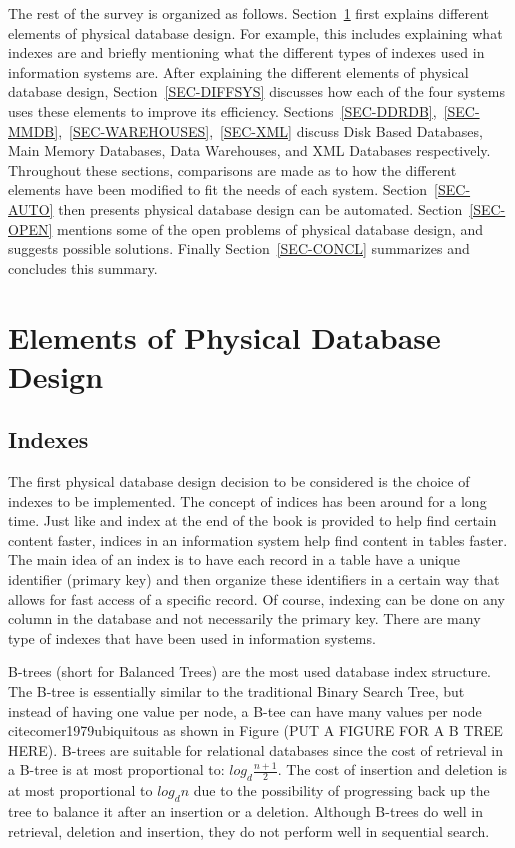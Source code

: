 \documentclass[12pt,a4paper]{article}
\begin{document}
The rest of the survey is organized as follows. Section~\ref{SEC-ELEMENTS} first explains different elements of physical database design. For example, this includes explaining what indexes are and briefly mentioning what the different types of indexes used in information systems are. After explaining the different elements of physical database design, Section~\ref{SEC-DIFFSYS} discusses how each of the four systems uses these elements to improve its efficiency. Sections~\ref{SEC-DDRDB},~\ref{SEC-MMDB},~\ref{SEC-WAREHOUSES},~\ref{SEC-XML} discuss Disk Based Databases, Main Memory Databases, Data Warehouses, and XML Databases respectively. Throughout these sections, comparisons are made as to how the different elements have been modified to fit the needs of each system. Section~\ref{SEC-AUTO} then presents physical database design can be automated. Section~\ref{SEC-OPEN} mentions some of the open problems of physical database design, and suggests possible solutions. Finally Section~\ref{SEC-CONCL} summarizes and concludes this summary.

\section{Elements of Physical Database Design}
\label{SEC-ELEMENTS}

\subsection{Indexes}

The first physical database design decision to be considered is the choice of indexes to be implemented. The concept of indices has been around for a long time. Just like and index at the end of the book is provided to help find certain content faster, indices in an information system help find content in tables faster. The main idea of an index is to have each record in a table have a unique identifier (primary key) and then organize these identifiers in a certain way that allows for fast access of a specific record. Of course, indexing can be done on any column in the database and not necessarily the primary key. There are many type of indexes that have been used in information systems. 

B-trees (short for Balanced Trees) are the most used database index structure.  The B-tree is essentially similar to the traditional Binary Search Tree, but instead of having one value per node, a B-tee can have many values per node~
cite{comer1979ubiquitous} as shown in Figure (PUT A FIGURE FOR A B TREE HERE). B-trees are suitable for relational databases since the cost of retrieval in a B-tree is at most proportional to: $log_{d}\frac{n+1}{2}$. The cost of insertion and deletion is at most proportional to $log_{d}n$ due to the possibility of progressing back up the tree to balance it after an insertion or a deletion. Although B-trees do well in retrieval, deletion and insertion, they do not perform well in sequential search. 
\end{document}
